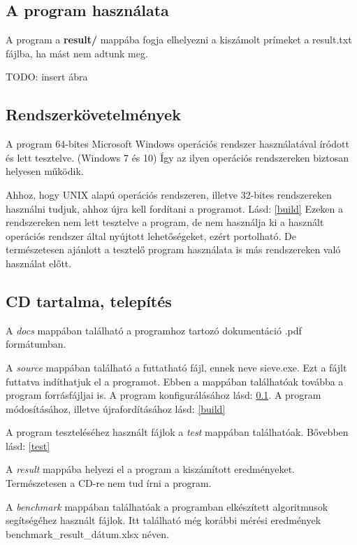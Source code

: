 \documentclass[twoside, a4paper, 12pt]{article}
\begin{document}
\subsection{A program használata} \label{usage}

A program a \textbf{result/} mappába fogja elhelyezni a kiszámolt prímeket a result.txt fájlba, ha mást nem adtunk meg.\par
TODO: insert ábra

\subsection{Rendszerkövetelmények}

A program 64-bites Microsoft Windows operációs rendszer használatával íródott és lett tesztelve. (Windows 7 és 10) Így az ilyen operációs rendszereken biztosan helyesen működik. \par
Ahhoz, hogy UNIX alapú operációs rendszeren, illetve 32-bites rendszereken használni tudjuk, ahhoz újra kell fordítani a programot. Lásd: \ref{build} Ezeken a rendszereken nem lett tesztelve a program, de nem használja ki a használt operációs rendszer által nyújtott lehetőségeket, ezért portolható. De természetesen ajánlott a tesztelő program használata is más rendszereken való használat előtt.

\subsection{CD tartalma, telepítés}

A \textit{docs} mappában található a programhoz tartozó dokumentáció .pdf formátumban. \par
A \textit{source} mappában található a futtatható fájl, ennek neve sieve.exe. Ezt a fájlt futtatva indíthatjuk el a programot. Ebben a mappában találhatóak továbba a program forrásfájljai is.  A program konfigurálásához lásd: \ref{usage}. A program módosításához, illetve újrafordításához lásd: \ref{build} \par
A program teszteléséhez használt fájlok a \textit{test} mappában találhatóak. Bővebben lásd: \ref{test} \par
A \textit{result} mappába helyezi el a program a kiszámított eredményeket. Természetesen a CD-re nem tud írni a program. \par
A \textit{benchmark} mappában találhatóak a programban elkészített algoritmusok segítségéhez használt fájlok. Itt található még korábbi mérési eredmények benchmark\_result\_dátum.xlsx néven. \bigskip
\end{document}
